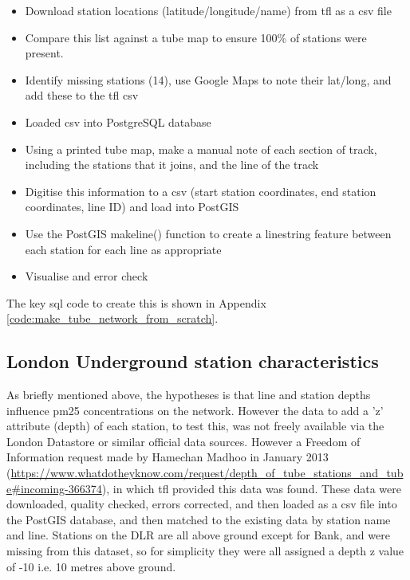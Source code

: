 \begin{itemize}
\item Download station locations (latitude/longitude/name) from \gls{tfl} as a \gls{csv} file
\item Compare this list against a tube map to ensure 100\% of stations were present.
\item Identify missing stations (14), use Google Maps to note their lat/long, and add these to the \gls{tfl} \gls{csv}
\item Loaded \gls{csv} into PostgreSQL database
\item Using a printed tube map, make a manual note of each section of track, including the stations that it joins, and the line of the track
\item Digitise this information to a \gls{csv} (start station coordinates, end station coordinates, line ID) and load into PostGIS
\item Use the PostGIS makeline() function to create a linestring feature between each station for each line as appropriate
\item Visualise and error check
\end{itemize}

The key \gls{sql} code to create this is shown in Appendix \autoref{code:make_tube_network_from_scratch}.

\subsection{London Underground station characteristics}
\label{subsec:station_characteristics}
As briefly mentioned above, the hypotheses is that line and station depths influence \gls{pm25} concentrations on the network. However the data to add a 'z' attribute (depth) of each station, to test this, was not freely available via the London Datastore or similar official data sources. However a Freedom of Information request made by Hamechan Madhoo in January 2013 (\url{https://www.whatdotheyknow.com/request/depth_of_tube_stations_and_tube#incoming-366374}), in which \gls{tfl} provided this data was found. These data were downloaded, quality checked, errors corrected, and then loaded as a \gls{csv} file into the PostGIS database, and then matched to the existing data by station name and line. Stations on the DLR are all above ground except for Bank, and were missing from this dataset, so for simplicity they were all assigned a depth z value of -10 i.e. 10 metres above ground.

